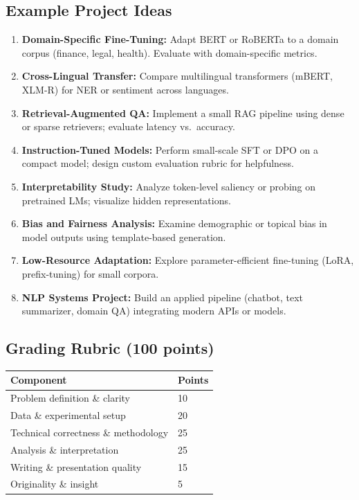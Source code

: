 \documentclass[12pt]{article}
\begin{document}
\subsection*{Example Project Ideas}
\begin{enumerate}[leftmargin=*]
  \item \textbf{Domain-Specific Fine-Tuning:} Adapt BERT or RoBERTa to a domain corpus (finance, legal, health). Evaluate with domain-specific metrics.
  \item \textbf{Cross-Lingual Transfer:} Compare multilingual transformers (mBERT, XLM-R) for NER or sentiment across languages.
  \item \textbf{Retrieval-Augmented QA:} Implement a small RAG pipeline using dense or sparse retrievers; evaluate latency vs.\ accuracy.
  \item \textbf{Instruction-Tuned Models:} Perform small-scale SFT or DPO on a compact model; design custom evaluation rubric for helpfulness.
  \item \textbf{Interpretability Study:} Analyze token-level saliency or probing on pretrained LMs; visualize hidden representations.
  \item \textbf{Bias and Fairness Analysis:} Examine demographic or topical bias in model outputs using template-based generation.
  \item \textbf{Low-Resource Adaptation:} Explore parameter-efficient fine-tuning (LoRA, prefix-tuning) for small corpora.
  \item \textbf{NLP Systems Project:} Build an applied pipeline (chatbot, text summarizer, domain QA) integrating modern APIs or models.
\end{enumerate}


\subsection*{Grading Rubric (100 points)}
\begin{tabular}{ll}
\textbf{Component} & \textbf{Points} \\
\hline
Problem definition \& clarity & 10 \\
Data \& experimental setup & 20 \\
Technical correctness \& methodology & 25 \\
Analysis \& interpretation & 25 \\
Writing \& presentation quality & 15 \\
Originality \& insight & 5 \\
\end{tabular}
\end{document}
